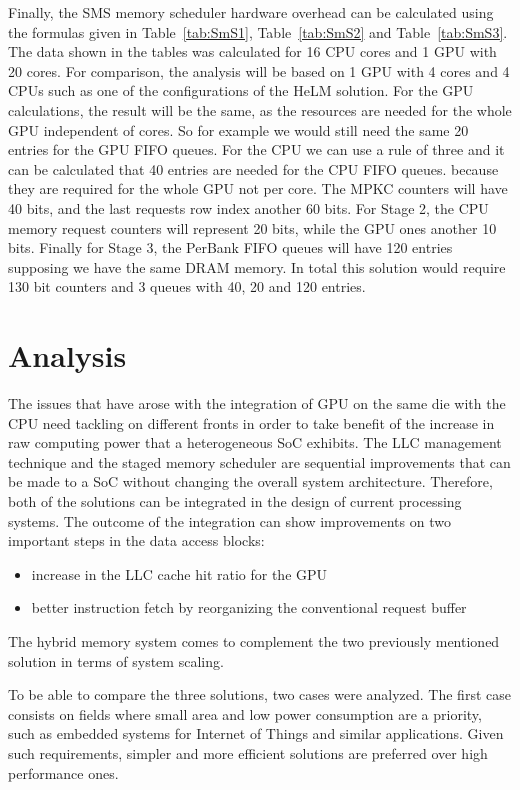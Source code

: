 \documentclass[journal]{IEEEtran}
\begin{document}
Finally, the SMS memory scheduler hardware overhead can be calculated using the formulas given in Table~\ref{tab:SmS1}, Table~\ref{tab:SmS2} and Table~\ref{tab:SmS3}. The data shown in the tables was calculated for 16 CPU cores and 1 GPU with 20 cores. For comparison, the analysis will be based on 1 GPU with 4 cores and 4 CPUs such as one of the configurations of the HeLM solution. For the GPU calculations, the result will be the same, as the resources are needed for the whole GPU independent of cores. So for example we would still need the same 20 entries for the GPU FIFO queues. For the CPU we can use a rule of three and it can be calculated that 40 entries are needed for the CPU FIFO queues. because they are required for the whole GPU not per core. The MPKC counters will have 40 bits, and the last requests row index another 60 bits. For Stage 2, the CPU memory request counters will represent 20 bits, while the GPU ones another 10 bits. Finally for Stage 3, the PerBank FIFO queues will have 120 entries supposing we have the same DRAM memory. In total this solution would require 130 bit counters and 3 queues with 40, 20 and 120 entries.

\section{Analysis}
The issues that have arose with the integration of GPU on the same die with the CPU need tackling on different fronts in order to take benefit of the increase in raw computing power that a heterogeneous SoC exhibits. 
The LLC management technique and the staged memory scheduler are sequential improvements that can be made to a SoC without changing the overall system architecture. Therefore, both of the solutions can be integrated in the design of current processing systems. The outcome of the integration can show improvements on two important steps in the data access blocks:
\begin{itemize}
	\item
	increase in the LLC cache hit ratio for the GPU
	\item
	better instruction fetch by reorganizing the conventional request buffer 
\end{itemize}
The hybrid memory system comes to complement the two previously mentioned solution in terms of system scaling. 

To be able to compare the three solutions, two cases were analyzed. The first case consists on fields where small area and low power consumption are a priority, such as embedded systems for Internet of Things and similar applications. Given such requirements, simpler and more efficient solutions are preferred over high performance ones.
\end{document}
